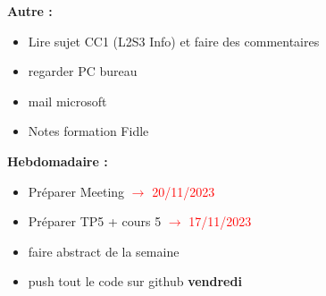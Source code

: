 \textbf{Autre :}
\begin{itemize}[label=$\square$] 
	\item[\done] Lire sujet CC1 (L2S3 Info) et faire des commentaires
	\item[\done] regarder PC bureau
	\item[\done] mail microsoft
	\item Notes formation Fidle
\end{itemize}
\textbf{Hebdomadaire :}
\begin{itemize}[label=$\square$] 
	\item[\wontfix] Préparer Meeting \textcolor{red}{$\rightarrow$ 20/11/2023}
	\item[\done] Préparer TP5 + cours 5 \textcolor{red}{$\rightarrow$ 17/11/2023}
	\item faire abstract de la semaine 
	\item push tout le code sur github \textbf{vendredi}
\end{itemize}